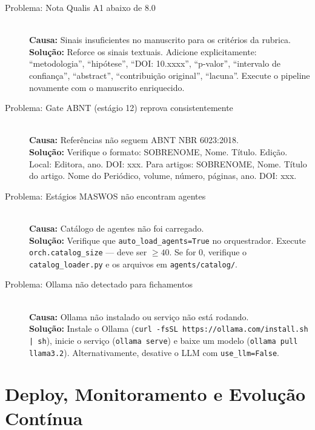 \begin{description}
  \item[Problema: Nota Qualis A1 abaixo de 8.0] \hfill \\
  \textbf{Causa:} Sinais insuficientes no manuscrito para os critérios da rubrica. \\
  \textbf{Solução:} Reforce os sinais textuais. Adicione explicitamente: ``metodologia'', ``hipótese'', ``DOI: 10.xxxx'', ``p-valor'', ``intervalo de confiança'', ``abstract'', ``contribuição original'', ``lacuna''. Execute o pipeline novamente com o manuscrito enriquecido.
  
  \item[Problema: Gate ABNT (estágio 12) reprova consistentemente] \hfill \\
  \textbf{Causa:} Referências não seguem ABNT NBR 6023:2018. \\
  \textbf{Solução:} Verifique o formato: SOBRENOME, Nome. Título. Edição. Local: Editora, ano. DOI: xxx. Para artigos: SOBRENOME, Nome. Título do artigo. Nome do Periódico, volume, número, páginas, ano. DOI: xxx.
  
  \item[Problema: Estágios MASWOS não encontram agentes] \hfill \\
  \textbf{Causa:} Catálogo de agentes não foi carregado. \\
  \textbf{Solução:} Verifique que \texttt{auto\_load\_agents=True} no orquestrador. Execute \texttt{orch.catalog\_size} — deve ser $\ge 40$. Se for 0, verifique o \texttt{catalog\_loader.py} e os arquivos em \texttt{agents/catalog/}.
  
  \item[Problema: Ollama não detectado para fichamentos] \hfill \\
  \textbf{Causa:} Ollama não instalado ou serviço não está rodando. \\
  \textbf{Solução:} Instale o Ollama (\texttt{curl -fsSL https://ollama.com/install.sh | sh}), inicie o serviço (\texttt{ollama serve}) e baixe um modelo (\texttt{ollama pull llama3.2}). Alternativamente, desative o LLM com \texttt{use\_llm=False}.
\end{description}

\section{Deploy, Monitoramento e Evolução Contínua}
\label{sec:deploy}

